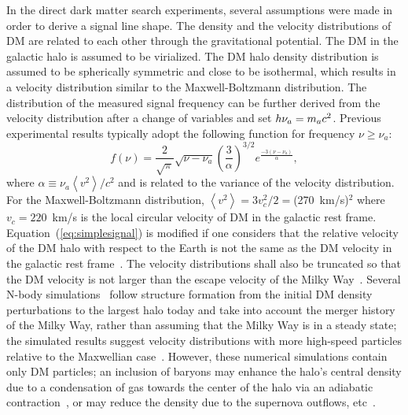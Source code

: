 In the direct dark matter search experiments, several assumptions were 
made in order to derive a signal line shape. 
The density and the velocity distributions of DM are related to each other 
through the gravitational potential. The DM in the galactic halo is assumed 
to be virialized. The DM halo density distribution is assumed 
to be spherically symmetric and close to be isothermal, which results in a 
velocity distribution similar to the Maxwell-Boltzmann distribution. The 
distribution of the measured signal frequency can be further derived from the 
velocity distribution after a change of variables and set 
\(h\nu_a = m_a c^2\). Previous experimental results typically adopt the 
following function for frequency $\nu\ge\nu_a$: 
\begin{equation}
f(\nu) = \frac{2}{\sqrt{\pi}}\sqrt{\nu-\nu_a}\left(\frac{3}{\alpha}\right)^{3/2}
e^{\frac{-3\left(\nu-\nu_a\right)}{\alpha}}, 
\label{eq:simplesignal}
\end{equation}
where $\alpha\equiv  \nu_a \left<v^2\right>/c^2$ and is related to the 
variance of the velocity distribution. For the Maxwell-Boltzmann distribution, 
$\left<v^2\right>=3v_c^2/2=$(270~km/s)$^2$ where $v_c=220$~km/s is the local 
circular velocity of DM in the galactic rest frame. 
Equation~(\ref{eq:simplesignal}) 
is modified if one considers that the relative velocity of the DM halo with 
respect to the Earth is not the same as the DM velocity in the galactic rest 
frame~\cite{SignalLineShapeI}. The velocity distributions shall also be 
truncated so that the DM velocity is not larger than the escape velocity of 
the Milky Way~\cite{Lisanti:2016jxe}. 
Several N-body simulations~\cite{Diemand:2008in,Springel:2008cc} follow 
structure formation from the initial DM density perturbations to the largest 
halo today and take into account the merger history of the Milky Way, rather 
than assuming that the Milky Way is in a steady state; the simulated results 
 suggest velocity distributions with more high-speed particles relative 
to the Maxwellian case~\cite{Navarro:1995iw,Burkert:1995yz}. However, these 
numerical simulations contain only DM particles; an inclusion of baryons may 
enhance the halo's central density due to a condensation of gas towards the 
center of the halo via an adiabatic 
contraction~\cite{Blumenthal:1985qy,Gnedin:2004cx}, or may reduce 
the density due to the supernova outflows, etc~\cite{Mashchenko:2007jp,Governato:2009bg}. 


